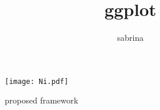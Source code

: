 \documentclass{article}
\title{ggplot}
\author{sabrina}
\begin{document}
\begin{figure}[h]
  \centering
 \texttt{[image: Ni.pdf]}
 \caption{proposed framework}
 \label{fig:ggplot}
\end{figure}
\end{document}
